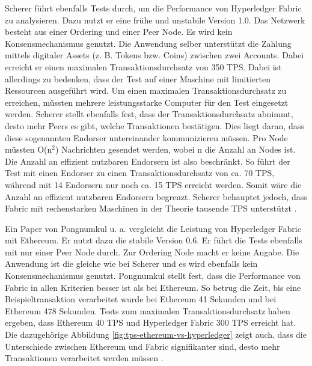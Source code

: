 Scherer führt ebenfalls Tests durch, um die Performance von Hyperledger Fabric zu analysieren. Dazu nutzt er eine frühe und unstabile Version 1.0. Das Netzwerk besteht aus einer Ordering und einer Peer Node. Es wird kein Konsensmechanismus genutzt. Die Anwendung selber unterstützt die Zahlung mittels digitaler Assets (z. B. Tokens bzw. Coins) zwischen zwei Accounts. Dabei erreicht er einen maximalen Transaktionsdurchsatz von 350 \acs{TPS}. Dabei ist allerdings zu bedenken, dass der Test auf einer Maschine mit limitierten Ressourcen ausgeführt wird. Um einen maximalen Transaktionsdurchsatz zu erreichen, müssten mehrere leistungsstarke Computer für den Test eingesetzt werden. Scherer stellt ebenfalls fest, dass der Transaktionsdurchsatz abnimmt, desto mehr Peers es gibt, welche Transaktionen bestätigen. Dies liegt daran, dass diese sogenannten Endorser untereinander kommunizieren müssen. Pro Node müssten O(n$^2$) Nachrichten gesendet werden, wobei n die Anzahl an Nodes ist. Die Anzahl an effizient nutzbaren Endorsern ist also beschränkt. So führt der Test mit einen Endorser zu einen Transaktionsdurchsatz von ca. 70 \acs{TPS}, während mit 14 Endorsern nur noch ca. 15 \acs{TPS} erreicht werden. Somit wäre die Anzahl an effizient nutzbaren Endorsern begrenzt. Scherer behauptet jedoch, dass Fabric mit rechenstarken Maschinen in der Theorie tausende \acs{TPS} unterstützt \cite{SchererPerformanceScalabilityBlockchain2017}.

Ein Paper von Pongnumkul u. a. vergleicht die Leistung von Hyperledger Fabric mit Ethereum. Er nutzt dazu die stabile Version 0.6. Er führt die Tests ebenfalls mit nur einer Peer Node durch. Zur Ordering Node macht er keine Angabe. Die Anwendung ist die gleiche wie bei Scherer und es wird ebenfalls kein Konsensmechanismus genutzt. Pongnumkul stellt fest, dass die Performance von Fabric in allen Kriterien besser ist als bei Ethereum. So betrug die Zeit, bis eine Beispieltransaktion verarbeitet wurde bei Ethereum 41 Sekunden und bei Ethereum 478 Sekunden. Tests zum maximalen Transaktionsdurchsatz haben ergeben, dass Ethereum 40 \acs{TPS} und Hyperledger Fabric 300 \acs{TPS} erreicht hat. Die dazugehörige Abbildung \ref{fig:tps-ethereum-vs-hyperledger} zeigt auch, dass die Unterschiede zwischen Ethereum und Fabric signifikanter sind, desto mehr Transaktionen verarbeitet werden müssen \cite{PongnumkulPerformanceAnalysisPrivate2017}.


